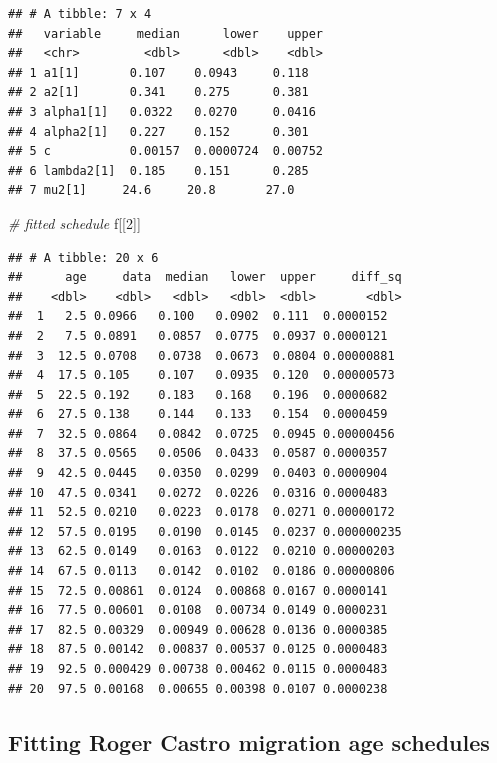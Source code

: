 \documentclass[
]{book}
\newenvironment{Shaded}{\begin{snugshade}}{\end{snugshade}}
\newcommand{\CommentTok}[1]{\textcolor[rgb]{0.56,0.35,0.01}{\textit{#1}}}
\newcommand{\DecValTok}[1]{\textcolor[rgb]{0.00,0.00,0.81}{#1}}
\newcommand{\NormalTok}[1]{#1}
\begin{document}
\begin{verbatim}
## # A tibble: 7 x 4
##   variable     median      lower    upper
##   <chr>         <dbl>      <dbl>    <dbl>
## 1 a1[1]       0.107    0.0943     0.118  
## 2 a2[1]       0.341    0.275      0.381  
## 3 alpha1[1]   0.0322   0.0270     0.0416 
## 4 alpha2[1]   0.227    0.152      0.301  
## 5 c           0.00157  0.0000724  0.00752
## 6 lambda2[1]  0.185    0.151      0.285  
## 7 mu2[1]     24.6     20.8       27.0
\end{verbatim}

\begin{Shaded}
\begin{Highlighting}[]
\CommentTok{\# fitted schedule}
\NormalTok{f[[}\DecValTok{2}\NormalTok{]]}
\end{Highlighting}
\end{Shaded}

\begin{verbatim}
## # A tibble: 20 x 6
##      age     data  median   lower  upper     diff_sq
##    <dbl>    <dbl>   <dbl>   <dbl>  <dbl>       <dbl>
##  1   2.5 0.0966   0.100   0.0902  0.111  0.0000152  
##  2   7.5 0.0891   0.0857  0.0775  0.0937 0.0000121  
##  3  12.5 0.0708   0.0738  0.0673  0.0804 0.00000881 
##  4  17.5 0.105    0.107   0.0935  0.120  0.00000573 
##  5  22.5 0.192    0.183   0.168   0.196  0.0000682  
##  6  27.5 0.138    0.144   0.133   0.154  0.0000459  
##  7  32.5 0.0864   0.0842  0.0725  0.0945 0.00000456 
##  8  37.5 0.0565   0.0506  0.0433  0.0587 0.0000357  
##  9  42.5 0.0445   0.0350  0.0299  0.0403 0.0000904  
## 10  47.5 0.0341   0.0272  0.0226  0.0316 0.0000483  
## 11  52.5 0.0210   0.0223  0.0178  0.0271 0.00000172 
## 12  57.5 0.0195   0.0190  0.0145  0.0237 0.000000235
## 13  62.5 0.0149   0.0163  0.0122  0.0210 0.00000203 
## 14  67.5 0.0113   0.0142  0.0102  0.0186 0.00000806 
## 15  72.5 0.00861  0.0124  0.00868 0.0167 0.0000141  
## 16  77.5 0.00601  0.0108  0.00734 0.0149 0.0000231  
## 17  82.5 0.00329  0.00949 0.00628 0.0136 0.0000385  
## 18  87.5 0.00142  0.00837 0.00537 0.0125 0.0000483  
## 19  92.5 0.000429 0.00738 0.00462 0.0115 0.0000483  
## 20  97.5 0.00168  0.00655 0.00398 0.0107 0.0000238
\end{verbatim}

\hypertarget{fitting-roger-castro-migration-age-schedules-4}{%
\subsection{Fitting Roger Castro migration age schedules}\label{fitting-roger-castro-migration-age-schedules-4}}
\end{document}
